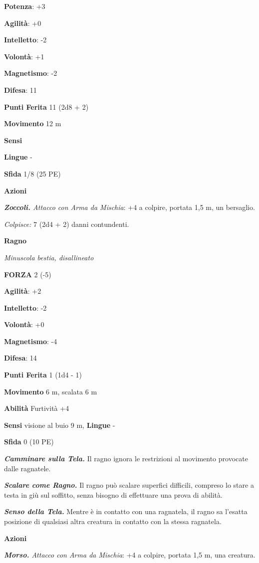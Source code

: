 \begin{multicols}{2}
\textbf{Potenza}: +3

\textbf{Agilità}: +0

\textbf{Intelletto}: -2

\textbf{Volontà}: +1

\textbf{Magnetismo}: -2

\textbf{Difesa}: 11

\textbf{Punti Ferita} 11 (2d8 + 2)

\textbf{Movimento} 12 m

\textbf{Sensi} 

\textbf{Lingue} -

\textbf{Sfida} 1/8 (25 PE)

\textbf{Azioni}

\emph{\textbf{Zoccoli.} Attacco con Arma da Mischia}: +4 a colpire,
portata 1,5 m, un bersaglio.

\emph{Colpisce:} 7 (2d4 + 2) danni contundenti.

\textbf{Ragno}

\emph{Minuscola bestia, disallineato}

\textbf{FORZA} 2 (-5)

\textbf{Agilità}: +2

\textbf{Intelletto}: -2

\textbf{Volontà}: +0

\textbf{Magnetismo}: -4

\textbf{Difesa}: 14

\textbf{Punti Ferita} 1 (1d4 - 1)

\textbf{Movimento} 6 m, scalata 6 m

\textbf{Abilità} Furtività +4

\textbf{Sensi} visione al buio 9 m, 
\textbf{Lingue} -

\textbf{Sfida} 0 (10 PE)

\emph{\textbf{Camminare sulla Tela.}} Il ragno ignora le restrizioni al
movimento provocate dalle ragnatele.

\emph{\textbf{Scalare come Ragno.}} Il ragno può scalare superfici
difficili, compreso lo stare a testa in giù sul soffitto, senza bisogno
di effettuare una prova di abilità.

\emph{\textbf{Senso della Tela.}} Mentre è in contatto con una
ragnatela, il ragno sa l'esatta posizione di qualsiasi altra creatura in
contatto con la stessa ragnatela.

\textbf{Azioni}

\emph{\textbf{Morso.} Attacco con Arma da Mischia}: +4 a colpire,
portata 1,5 m, una creatura.


\end{multicols}

